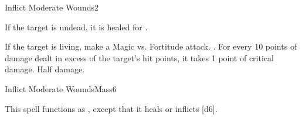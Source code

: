 \begin{spellsection}{Inflict Moderate Wounds}{2}
\begin{spellheader}
    \spellrng{\rngclose}
\end{spellheader}
\begin{spellcontent}
    \begin{spelltargetinginfo}
    \end{spelltargetinginfo}
    \begin{spelleffects}
        \spelleffect If the target is undead, it is healed for .
        \begin{spellattacktriggered}{If the target is living, make a Magic vs. Fortitude attack.}
            \spellsuccess {}. For every 10 points of damage dealt in excess of the target's hit points, it takes 1 point of critical damage.
            \spellfailure Half damage.
        \end{spellattacktriggered}
    \end{spelleffects}
\end{spellcontent}
\begin{spellfooter}
\end{spellfooter}
\end{spellsection}

\begin{spellsection}{Inflict Moderate Wounds}{Mass}{6}
\begin{spellheader}
\end{spellheader}
\begin{spellcontent}
    \begin{spelltargetinginfo}
    \end{spelltargetinginfo}
    \begin{spelleffects}
        \spellspecial This spell functions as , except that it heals or inflicts [d6].
    \end{spelleffects}
\end{spellcontent}
\begin{spellfooter}
\end{spellfooter}
\end{spellsection}

